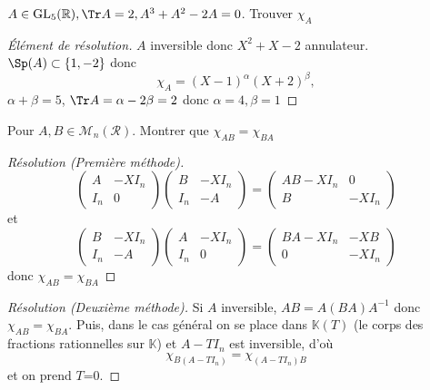 \begin{exo}
    $A\in\mathrm{GL}_5(\mathbb R), \Tr A=2, A^3+A^2-2A=0$. Trouver $\chi_A$
\end{exo}

\begin{proof}[Élément de résolution]
    $A$ inversible donc $X^2+X-2$ annulateur. $\Sp(A)\subset \{1, -2\}$ donc \[\chi_A=(X-1)^\alpha(X+2)^\beta,\] $\alpha+\beta=5$, $\Tr A=\alpha-2\beta=2$ donc $\alpha=4, \beta=1$
\end{proof}

\begin{exo}
    Pour $A, B\in\mathcal M_n(\mathcal R)$. Montrer que $\chi_{AB}=\chi_{BA}$
\end{exo}

\begin{proof}[Résolution (Première méthode)]
    \[
        \begin{pmatrix}
            A & -XI_n \\ I_n & 0
        \end{pmatrix} \begin{pmatrix}
            B & -XI_n \\ I_n & -A
        \end{pmatrix}= \begin{pmatrix}
            AB-XI_n & 0 \\ B & -XI_n
        \end{pmatrix}
    \]
    et \[
        \begin{pmatrix}
            B & -XI_n \\ I_n & -A
        \end{pmatrix} \begin{pmatrix}
            A & -XI_n \\ I_n & 0
        \end{pmatrix} = \begin{pmatrix}
            BA-XI_n & -XB \\ 0 & -XI_n
        \end{pmatrix}
    \]
    donc $\chi_{AB}=\chi_{BA}$
\end{proof}

\begin{proof}[Résolution (Deuxième méthode)]
    Si $A$ inversible, $AB=A(BA)A^{-1}$ donc $\chi_{AB}=\chi_{BA}$. Puis, dans le cas général on se place dans $\mathbb K(T)$ (le corps des fractions rationnelles sur $\mathbb K$) et $A-TI_n$ est inversible, d'où \[
        \chi_{B(A-TI_n)}=\chi_{(A-TI_n)B}
    \]
    et on prend $T$=0.
\end{proof}

